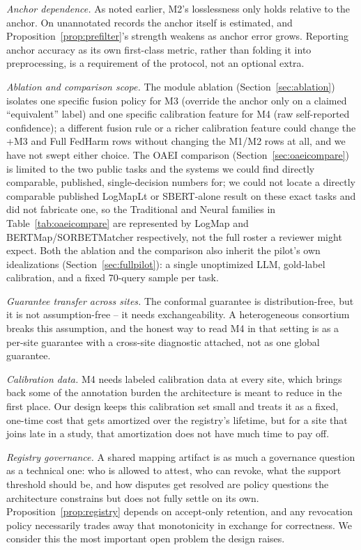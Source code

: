 \documentclass[conference]{IEEEtran}
\begin{document}
\textit{Anchor dependence.} As noted earlier, M2's losslessness only holds relative to the anchor. On unannotated records the anchor itself is estimated, and Proposition~\ref{prop:prefilter}'s strength weakens as anchor error grows. Reporting anchor accuracy as its own first-class metric, rather than folding it into preprocessing, is a requirement of the protocol, not an optional extra.

\textit{Ablation and comparison scope.} The module ablation (Section~\ref{sec:ablation}) isolates one specific fusion policy for M3 (override the anchor only on a claimed ``equivalent'' label) and one specific calibration feature for M4 (raw self-reported confidence); a different fusion rule or a richer calibration feature could change the +M3 and Full FedHarm rows without changing the M1/M2 rows at all, and we have not swept either choice. The OAEI comparison (Section~\ref{sec:oaeicompare}) is limited to the two public tasks and the systems we could find directly comparable, published, single-decision numbers for; we could not locate a directly comparable published LogMapLt or SBERT-alone result on these exact tasks and did not fabricate one, so the Traditional and Neural families in Table~\ref{tab:oaeicompare} are represented by LogMap and BERTMap/SORBETMatcher respectively, not the full roster a reviewer might expect. Both the ablation and the comparison also inherit the pilot's own idealizations (Section~\ref{sec:fullpilot}): a single unoptimized LLM, gold-label calibration, and a fixed 70-query sample per task.

\textit{Guarantee transfer across sites.} The conformal guarantee is distribution-free, but it is not assumption-free -- it needs exchangeability. A heterogeneous consortium breaks this assumption, and the honest way to read M4 in that setting is as a per-site guarantee with a cross-site diagnostic attached, not as one global guarantee.

\textit{Calibration data.} M4 needs labeled calibration data at every site, which brings back some of the annotation burden the architecture is meant to reduce in the first place. Our design keeps this calibration set small and treats it as a fixed, one-time cost that gets amortized over the registry's lifetime, but for a site that joins late in a study, that amortization does not have much time to pay off.

\textit{Registry governance.} A shared mapping artifact is as much a governance question as a technical one: who is allowed to attest, who can revoke, what the support threshold should be, and how disputes get resolved are policy questions the architecture constrains but does not fully settle on its own. Proposition~\ref{prop:registry} depends on accept-only retention, and any revocation policy necessarily trades away that monotonicity in exchange for correctness. We consider this the most important open problem the design raises.
\end{document}
